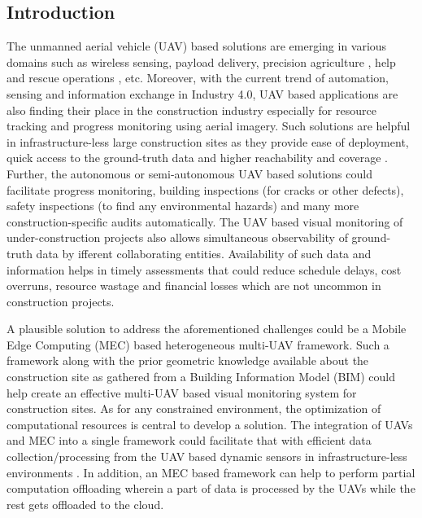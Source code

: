 \documentclass{article}
\begin{document}
\begin{multicols}{2}
\section{Introduction}
The unmanned aerial vehicle (UAV) based solutions are emerging in various domains such as wireless sensing\cite{mozaffari2019tutorial}, payload delivery\cite{ruggiero2018aerial}, precision agriculture \cite{boursianis2020internet}, help and rescue operations \cite{waharte2010supporting}, etc. Moreover, with the current
trend of automation, sensing and information exchange in Industry 4.0, UAV based applications are also finding their place in the construction industry especially for resource tracking and progress monitoring using aerial imagery. Such solutions are helpful in infrastructure-less large construction sites as they provide ease of deployment, quick access to the ground-truth data and higher reachability and coverage \cite{hamledari2018uav}. Further, the autonomous or semi-autonomous UAV based solutions could facilitate progress monitoring, building inspections (for cracks or other defects), safety inspections (to find any environmental hazards) and many more construction-specific audits automatically. The UAV based visual monitoring of under-construction projects also allows simultaneous observability of ground-truth data by ifferent collaborating entities. Availability of such data and information helps in timely assessments that could reduce schedule delays, cost overruns, resource wastage and financial losses which are not uncommon in construction projects. \par

A plausible solution to address the aforementioned challenges could be a Mobile Edge Computing (MEC) \cite{mao2017survey} based heterogeneous multi-UAV framework. Such a framework along with the prior geometric knowledge available about the construction site as gathered from a Building Information Model (BIM)\cite{golparvar2011integrated} could help create an effective multi-UAV based visual monitoring system for construction sites. As for any constrained environment, the optimization of computational resources is central to develop a solution. The integration of UAVs and MEC into a single framework could facilitate that with efficient data collection/processing from the UAV based dynamic sensors in infrastructure-less environments \cite{nguyen2020towards}. In addition, an MEC based framework can help to perform partial
computation offloading wherein a part of data is processed by the UAVs while the rest gets offloaded to the cloud.\par


\end{multicols}
\end{document}
